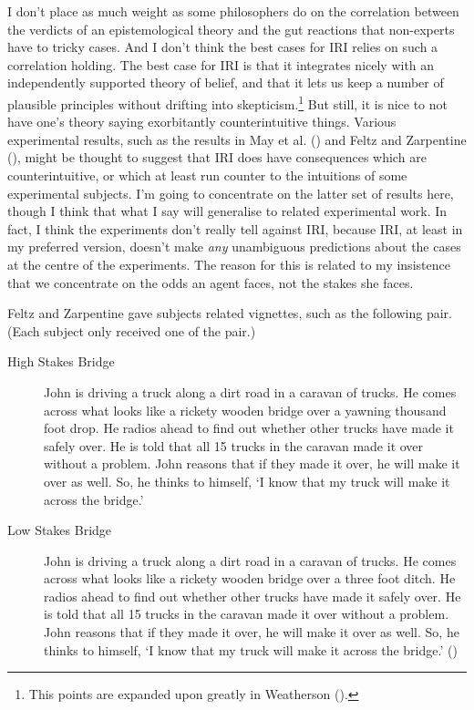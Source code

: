 \documentclass[
  11pt,
  letterpaper,
  DIV=11,
  numbers=noendperiod,
  twoside]{scrartcl}
\begin{document}
I don't place as much weight as some philosophers do on the correlation
between the verdicts of an epistemological theory and the gut reactions
that non-experts have to tricky cases. And I don't think the best cases
for IRI relies on such a correlation holding. The best case for IRI is
that it integrates nicely with an independently supported theory of
belief, and that it lets us keep a number of plausible principles
without drifting into skepticism.\footnote{This points are expanded upon
  greatly in Weatherson ().} But
still, it is nice to not have one's theory saying exorbitantly
counterintuitive things. Various experimental results, such as the
results in May et al. () and Feltz and
Zarpentine (), might be thought
to suggest that IRI does have consequences which are counterintuitive,
or which at least run counter to the intuitions of some experimental
subjects. I'm going to concentrate on the latter set of results here,
though I think that what I say will generalise to related experimental
work. In fact, I think the experiments don't really tell against IRI,
because IRI, at least in my preferred version, doesn't make \emph{any}
unambiguous predictions about the cases at the centre of the
experiments. The reason for this is related to my insistence that we
concentrate on the odds an agent faces, not the stakes she faces.

Feltz and Zarpentine gave subjects related vignettes, such as the
following pair. (Each subject only received one of the pair.)

\begin{description}
\item[High Stakes Bridge]
John is driving a truck along a dirt road in a caravan of trucks. He
comes across what looks like a rickety wooden bridge over a yawning
thousand foot drop. He radios ahead to find out whether other trucks
have made it safely over. He is told that all 15 trucks in the caravan
made it over without a problem. John reasons that if they made it over,
he will make it over as well. So, he thinks to himself, `I know that my
truck will make it across the bridge.'
\item[Low Stakes Bridge]
John is driving a truck along a dirt road in a caravan of trucks. He
comes across what looks like a rickety wooden bridge over a three foot
ditch. He radios ahead to find out whether other trucks have made it
safely over. He is told that all 15 trucks in the caravan made it over
without a problem. John reasons that if they made it over, he will make
it over as well. So, he thinks to himself, `I know that my truck will
make it across the bridge.' ()
\end{description}
\end{document}
